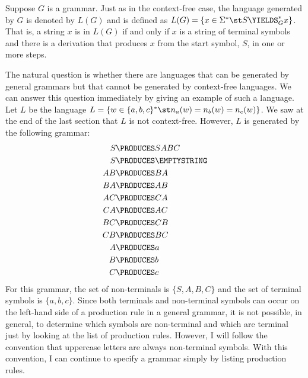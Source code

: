 Suppose $G$ is a grammar.  Just as in the context-free case,
the language generated by $G$ is denoted by $L(G)$ and is defined
as $L(G)=\{x\in\Sigma^*\st S \YIELDS_G^* x\}$.  That is, a string
$x$ is in $L(G)$ if and only if $x$ is a string of terminal symbols
and there is a derivation that produces $x$ from the start symbol,
$S$, in one or more steps.

The natural question is whether there are languages that can be generated
by general grammars but that cannot be generated by context-free languages.
We can answer this question immediately by giving an example of such
a language.  Let $L$ be the language $L=\{w\in\{a,b,c\}^*\st n_a(w)=n_b(w)=n_c(w)\}$.
We saw at the end of the last section that $L$ is not context-free.
However, $L$ is generated by the following grammar:
\begin{align*}
  S&\PRODUCES SABC\\
  S&\PRODUCES \EMPTYSTRING\\
  AB&\PRODUCES BA\\
  BA&\PRODUCES AB\\
  AC&\PRODUCES CA\\
  CA&\PRODUCES AC\\
  BC&\PRODUCES CB\\
  CB&\PRODUCES BC\\
  A&\PRODUCES a\\
  B&\PRODUCES b\\
  C&\PRODUCES c
\end{align*}
For this grammar, the set of non-terminals is $\{S,A,B,C\}$ and the set of
terminal symbols is $\{a,b,c\}$.  Since both terminals and non-terminal
symbols can occur on the left-hand side of a production rule in a general
grammar, it is not possible, in general, to determine which symbols are non-terminal and
which are terminal just by looking at the list of production rules.
However, I will follow the convention that uppercase letters are always
non-terminal symbols.  With this convention, I can continue to specify a
grammar simply by listing production rules.

